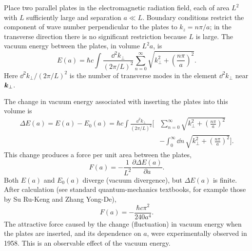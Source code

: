 Place two parallel plates in the electromagnetic radiation field, each of area $L^2$ with $L$ sufficiently large and separation $a\ll L$. Boundary conditions restrict the component of wave number perpendicular to the plates to $k_z=n\pi/a$; in the transverse direction there is no significant restriction because $L$ is large. The vacuum energy between the plates, in volume $L^2a$, is
\begin{equation}
E(a)=\hbar c\int\frac{\dd^2 k_\perp}{(2\pi/L)^2}
\sum_{n=0}^{\infty}\sqrt{k_\perp^2+\left(\frac{n\pi}{a}\right)^2}.
\end{equation}
Here $\dd^2k_\perp/(2\pi/L)^2$ is the number of transverse modes in the element $\dd^2k_\perp$ near $\bm{k}_\perp$.

The change in vacuum energy associated with inserting the plates into this volume is
\begin{equation}
\begin{split}
\Delta E(a)=E(a)-E_0(a)
=\hbar c\int\frac{\dd^2 k_\perp}{(2\pi/L)^2}
\bigg[&\sum_{n=0}^{\infty}\sqrt{k_\perp^2+\left(\frac{n\pi}{a}\right)^2}\\[-2pt]
&-\int_0^\infty\dd n\,\sqrt{k_\perp^2+\left(\frac{n\pi}{a}\right)^2}\bigg].
\end{split}
\end{equation}
This change produces a force per unit area between the plates,
\begin{equation}
F(a)=-\frac1{L^2}\frac{\partial\Delta E(a)}{\partial a}.
\end{equation}
Both $E(a)$ and $E_0(a)$ diverge (vacuum divergence), but $\Delta E(a)$ is finite. After calculation (see standard quantum-mechanics textbooks, for example those by Su Ru-Keng and Zhang Yong-De),
\begin{equation}
\boxed{F(a)=-\frac{\hbar c\pi^2}{240a^4}.}
\end{equation}
The attractive force caused by the change (fluctuation) in vacuum energy when the plates are inserted, and its dependence on $a$, were experimentally observed in 1958. This is an observable effect of the vacuum energy.


